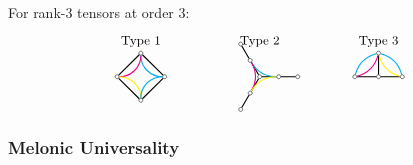 For rank-3 tensors at order 3:
\[
\begin{tikzpicture}[baseline=0, scale=0.6]
   \begin{scope}[xshift=0cm]
      \node at (0,1.5) {\small Type 1};
      \foreach \i in {0,1,2,3} {
         \node[circle, draw, fill=white, inner sep=1pt] (T\i) at (90*\i:1) {};
      }
      \draw[thick] (T0) -- (T1) -- (T2) -- (T3) -- (T0);
      \draw[cyan, thick, bend left=45] (T0) to (T1);
      \draw[magenta, thick, bend left=45] (T1) to (T2);
      \draw[yellow, thick, bend left=45] (T2) to (T3);
      \draw[cyan, thick, bend left=45] (T3) to (T0);
   \end{scope}
   
   \begin{scope}[xshift=5cm]
      \node at (0,1.5) {\small Type 2};
      \node[circle, draw, fill=white, inner sep=1pt] (C) at (0,0) {};
      \foreach \i in {0,120,240} {
         \node[circle, draw, fill=white, inner sep=1pt] (T\i) at (\i:0.8) {};
         \node[circle, draw, fill=white, inner sep=1pt] (S\i) at (\i:1.6) {};
      }
      \foreach \i in {0,120,240} {
         \draw[thick] (C) -- (T\i) -- (S\i);
      }
      \draw[cyan, thick, bend left=30] (T0) to (T120);
      \draw[magenta, thick, bend left=30] (T120) to (T240);
      \draw[yellow, thick, bend left=30] (T240) to (T0);
   \end{scope}
   
   \begin{scope}[xshift=10cm]
      \node at (0,1.5) {\small Type 3};
      \node[circle, draw, fill=white, inner sep=1pt] (L) at (-1,0) {};
      \node[circle, draw, fill=white, inner sep=1pt] (C) at (0,0) {};
      \node[circle, draw, fill=white, inner sep=1pt] (R) at (1,0) {};
      \node[circle, draw, fill=white, inner sep=1pt] (T) at (0,1) {};
      \draw[thick] (L) -- (C) -- (R);
      \draw[thick] (C) -- (T);
      \draw[cyan, thick, bend left=30] (L) to (T);
      \draw[magenta, thick, bend right=30] (L) to (T);
      \draw[yellow, thick, bend left=30] (R) to (T);
      \draw[cyan, thick, bend right=30] (R) to (T);
   \end{scope}
\end{tikzpicture}
\]

\subsubsection{Melonic Universality}

